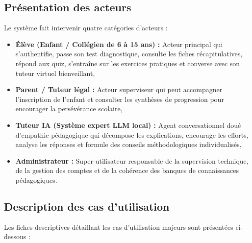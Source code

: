 \documentclass[12pt,a4paper]{report}
\begin{document}
\subsection{Présentation des acteurs}
Le système fait intervenir quatre catégories d'acteurs :
\begin{itemize}
  \item[—] \textbf{Élève (Enfant / Collégien de 6 à 15 ans) :} Acteur principal qui s'authentifie, passe son test diagnostique, consulte les fiches récapitulatives, répond aux quiz, s'entraîne sur les exercices pratiques et converse avec son tuteur virtuel bienveillant,
  \item[—] \textbf{Parent / Tuteur légal :} Acteur superviseur qui peut accompagner l'inscription de l'enfant et consulter les synthèses de progression pour encourager la persévérance scolaire,
  \item[—] \textbf{Tuteur IA (Système expert LLM local) :} Agent conversationnel doué d'empathie pédagogique qui décompose les explications, encourage les efforts, analyse les réponses et formule des conseils méthodologiques individualisés,
  \item[—] \textbf{Administrateur :} Super-utilisateur responsable de la supervision technique, de la gestion des comptes et de la cohérence des banques de connaissances pédagogiques.
\end{itemize}

\subsection{Description des cas d'utilisation}
Les fiches descriptives détaillant les cas d'utilisation majeurs sont présentées ci-dessous :
\end{document}
